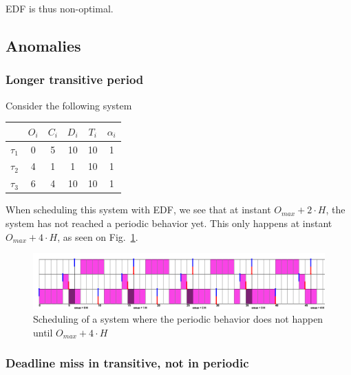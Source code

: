 \documentclass[a4paper,10pt]{article}
\begin{document}
        EDF is thus non-optimal.

    \subsection{Anomalies}

        \subsubsection{Longer transitive period}
        Consider the following system

        \begin{center}
            \begin{tabular}{|r|c|c|c|c|c|}
                \hline
                            & $O_i$ & $C_i$ & $D_i$ & $T_i$ & $\alpha_i$ \\ \hline
                $\tau_1$    & 0     & 5     & 10   & 10    & 1     \\ \hline
                $\tau_2$    & 4     & 1     & 1    & 10    & 1     \\ \hline
                $\tau_3$    & 6     & 4     & 10   & 10    & 1     \\ \hline
            \end{tabular}
        \end{center}

        When scheduling this system with EDF, we see that at instant $O_{max} + 2 \cdot H$, the system has not reached a periodic behavior yet. This only happens at instant $O_{max} + 4 \cdot H$, as seen on Fig.~\ref{fig:edf_longtransitive}.\\

        \begin{figure}[H]
        \begin{center}
            \centerline{\includegraphics[width=1.4\textwidth]{figs/longTransitive2_EDF.png}}
            \caption{Scheduling of a system where the periodic behavior does not happen until $O_{max} + 4 \cdot H$}
            \label{fig:edf_longtransitive}
        \end{center}
        \end{figure}

        \subsubsection{Deadline miss in transitive, not in periodic}
\end{document}
